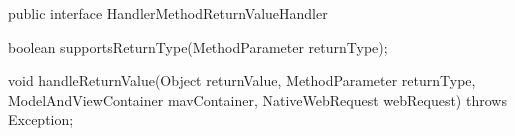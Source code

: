 \begin{frame}[fragile]
 \frametitle{}
 
 \begin{javacode}
public interface HandlerMethodReturnValueHandler {

  boolean supportsReturnType(MethodParameter returnType);

  void handleReturnValue(Object returnValue,
      MethodParameter returnType,
      ModelAndViewContainer mavContainer,
      NativeWebRequest webRequest) throws Exception;

}
 \end{javacode}

\end{frame}